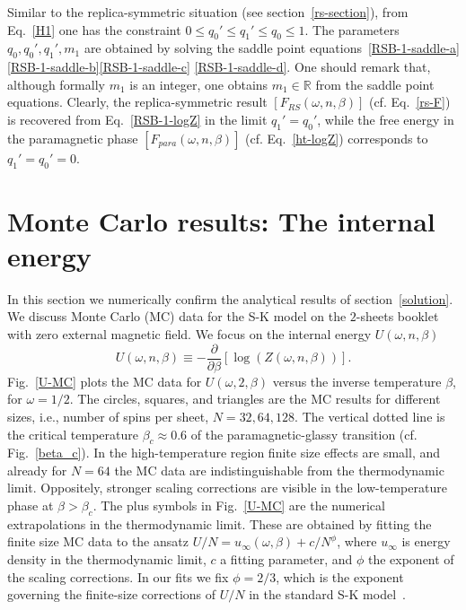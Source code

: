 \documentclass[twocolumn,superscriptaddress,prb,10pt]{revtex4-1}
\begin{document}
%
Similar to the replica-symmetric situation (see section~\ref{rs-section}), 
from Eq.~\eqref{H1} one has the constraint $0\le q_0'\le q_1'\le q_0\le 1$.
The parameters $q_0,q_0',q_1',m_1$ are obtained by solving the saddle 
point equations~\eqref{RSB-1-saddle-a}\eqref{RSB-1-saddle-b}\eqref{RSB-1-saddle-c}
\eqref{RSB-1-saddle-d}. One should remark that, although formally $m_1$ is an 
integer, one obtains $m_1\in\mathbb{R}$ from the saddle point equations. 
Clearly, the replica-symmetric result $[F_{RS}(\omega,n,\beta)]$ (cf. 
Eq.~\eqref{rs-F}) is recovered from Eq.~\eqref{RSB-1-logZ} in the limit 
$q_1'=q_0'$, while the free energy in the paramagnetic phase $[F_{para}(\omega,n,
\beta)]$ (cf. Eq.~\eqref{ht-logZ}) corresponds to $q_1'=q_0'=0$.

\section{Monte Carlo results: The internal energy}
\label{mc-results}

In this section we numerically confirm the analytical results of section~\ref{solution}. 
We discuss Monte Carlo (MC) data for the S-K model on the $2$-sheets booklet 
with zero external magnetic field. We focus on the internal energy $U(\omega,n,
\beta)$ 
%
\begin{equation}
\label{U-def}
U(\omega,n,\beta)\equiv-\frac{\partial}{\partial\beta}
[\log(Z(\omega,n,\beta))]. 
\end{equation}
%  
Fig.~\ref{U-MC} plots the MC data for $U(\omega,2,\beta)$ versus the inverse temperature 
$\beta$, for $\omega=1/2$. The circles, squares, and triangles 
are the MC results for different sizes, i.e., number of spins per sheet, $N=32,64,128$. 
The vertical dotted line is the critical temperature $\beta_c\approx 0.6$ of 
the paramagnetic-glassy transition (cf. Fig.~\ref{beta_c}). In the high-temperature 
region finite size effects are small, and already for $N=64$ the MC data are indistinguishable 
from the thermodynamic limit. Oppositely, stronger scaling corrections are visible in 
the low-temperature phase at $\beta>\beta_c$. 
The plus symbols in Fig.~\ref{U-MC} are the numerical extrapolations in the 
thermodynamic limit. These are obtained by fitting the finite size MC data 
to the ansatz $U/N=u_{\infty}(\omega,\beta)+c/N^{\phi}$, where 
$u_{\infty}$ is energy density in the thermodynamic limit, $c$ a fitting parameter, and 
$\phi$ the exponent of the scaling corrections. In our fits we fix $\phi=2/3$, which 
is the exponent governing the finite-size corrections of $U/N$ in 
the standard S-K model~\cite{billoire-2007,aspelmeier-2008}. 
\end{document}
